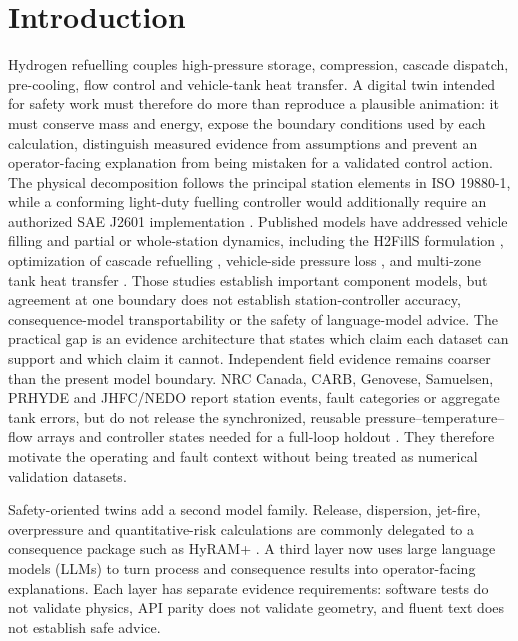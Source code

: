 \documentclass[12pt,a4paper]{article}
\begin{document}
\section{Introduction}
Hydrogen refuelling couples high-pressure storage, compression, cascade dispatch,
pre-cooling, flow control and vehicle-tank heat transfer. A digital twin intended
for safety work must therefore do more than reproduce a plausible animation: it
must conserve mass and energy, expose the boundary conditions used by each
calculation, distinguish measured evidence from assumptions and prevent an
operator-facing explanation from being mistaken for a validated control action.
The physical decomposition follows the principal station elements in ISO
19880-1, while a conforming light-duty fuelling controller would additionally
require an authorized SAE J2601 implementation \cite{iso19880,saej2601}.
Published models have addressed vehicle filling and partial or whole-station
dynamics, including the H2FillS formulation \cite{kuroki2021}, optimization of
cascade refuelling \cite{rothuizen2013}, vehicle-side pressure loss
\cite{rothuizen2020}, and multi-zone tank heat transfer \cite{xiao2024}.
Those studies establish important component models, but agreement at one
boundary does not establish station-controller accuracy, consequence-model
transportability or the safety of language-model advice. The practical gap is
an evidence architecture that states which claim each dataset can support and
which claim it cannot.
Independent field evidence remains coarser than the present model boundary.
NRC Canada, CARB, Genovese, Samuelsen, PRHYDE and JHFC/NEDO report station
events, fault categories or aggregate tank errors, but do not release the
synchronized, reusable pressure--temperature--flow arrays and controller states
needed for a full-loop holdout \cite{nrc2024,carb2024,genovese2024,samuelsen2020,
prhyde2023,monde2012}. They therefore motivate the operating and fault context
without being treated as numerical validation datasets.

Safety-oriented twins add a second model family. Release, dispersion, jet-fire,
overpressure and quantitative-risk calculations are commonly delegated to a
consequence package such as HyRAM+ \cite{hyram2024,hyram2025}. A third layer now
uses large language models (LLMs) to turn process and consequence results into
operator-facing explanations. Each layer has separate evidence requirements:
software tests do not validate physics, API parity does not validate geometry,
and fluent text does not establish safe advice.
\end{document}
